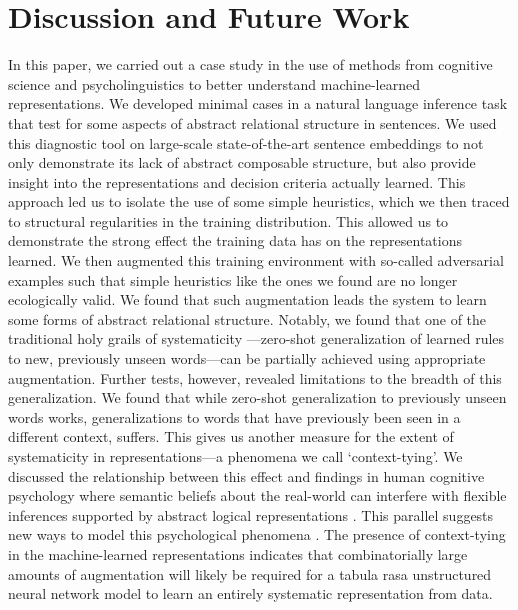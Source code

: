 \section{Discussion and Future Work}

In this paper, we carried out a case study in the use of methods from cognitive science and psycholinguistics to better understand machine-learned representations. We developed minimal cases in a natural language inference task that test for some aspects of abstract relational structure in sentences. We used this diagnostic tool on large-scale state-of-the-art sentence embeddings \citep{Conneau:2017uf} to not only demonstrate its lack of abstract composable structure, but also provide insight into the representations and decision criteria actually learned. This approach led us to isolate the use of some simple heuristics, which we then traced to structural regularities in the training distribution. This allowed us to demonstrate the strong effect the training data has on the representations learned. We then augmented this training environment with so-called adversarial examples such that simple heuristics like the ones we found are no longer ecologically valid. We found that such augmentation leads the system to learn some forms of abstract relational structure. Notably, we found that one of the traditional holy grails of systematicity ---zero-shot generalization of learned rules to new, previously unseen words---can be partially  achieved using appropriate augmentation. Further tests, however, revealed limitations to the breadth of this generalization. We found that while zero-shot generalization to previously unseen words works, generalizations to words that have previously been seen in a different context, suffers. This gives us another measure for the extent of systematicity in representations---a phenomena we call `context-tying'. We discussed the relationship between this effect and findings in human cognitive psychology where semantic beliefs about the real-world can interfere with flexible inferences supported by abstract logical representations \citep{evans2013psychology}. This parallel suggests new ways to model this psychological phenomena \citep{dasgupta2019theory}. The presence of context-tying in the machine-learned representations indicates that combinatorially large amounts of augmentation will likely be required for a tabula rasa unstructured neural network model to learn an entirely systematic representation from data. 

